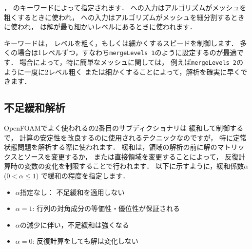 %
%
，
%
%
のキーワードによって指定されます．
%
%
への入力はアルゴリズムがメッシュを粗くするときに使われ，
%
%
への入力はアルゴリズムがメッシュを細分割するときに使われ，
%
%
は解が最も細かいレベルにあるときに使われます．

%
%
キーワードは，
レベルを粗く，もしくは細かくするスピードを制御します．
多くの場合は1レベルずつ，すなわち\texttt{mergeLevels 1}のように設定するのが最適です．
場合によって，特に簡単なメッシュに関しては，
例えば\texttt{mergeLevels 2}のように一度に2レベル粗く
または細かくすることによって，解析を確実に早くできます．


\subsection{不足緩和解析}
\label{ssec:4.5.2}
OpenFOAMでよく使われるの2番目のサブディクショナリは
緩和して制御するで，
計算の安定性を改良するのに使用されるテクニックなのですが，
特に定常状態問題を解析する際に使われます．
緩和は，領域の解析の前に解のマトリックスとソースを変更するか，
または直接領域を変更することによって，
反復計算時の変数の変化を制限することで行われます．
以下に示すように，緩和係数$\alpha$ ($0 < \alpha \le 1$) で緩和の程度を指定します．
\begin{itemize}
 \item $\alpha$指定なし： 不足緩和を適用しない
 \item $\alpha = 1$: 行列の対角成分の等価性・優位性が保証される
 \item $\alpha$の減少に伴い，不足緩和は強くなる
 \item $\alpha = 0$: 反復計算をしても解は変化しない
\end{itemize}

